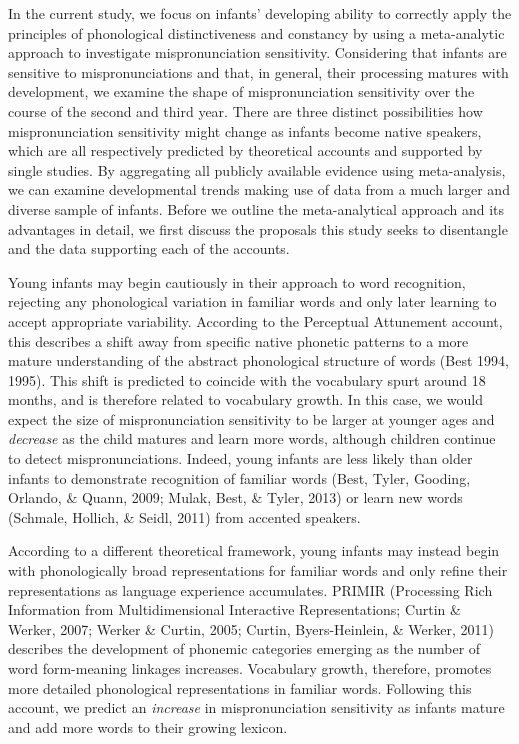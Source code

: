 \documentclass[man]{apa6}
\theoremstyle{definition}
\theoremstyle{definition}
\theoremstyle{definition}
\theoremstyle{remark}
\begin{document}
In the current study, we focus on infants' developing ability to
correctly apply the principles of phonological distinctiveness and
constancy by using a meta-analytic approach to investigate
mispronunciation sensitivity. Considering that infants are sensitive to
mispronunciations and that, in general, their processing matures with
development, we examine the shape of mispronunciation sensitivity over
the course of the second and third year. There are three distinct
possibilities how mispronunciation sensitivity might change as infants
become native speakers, which are all respectively predicted by
theoretical accounts and supported by single studies. By aggregating all
publicly available evidence using meta-analysis, we can examine
developmental trends making use of data from a much larger and diverse
sample of infants. Before we outline the meta-analytical approach and
its advantages in detail, we first discuss the proposals this study
seeks to disentangle and the data supporting each of the accounts.

Young infants may begin cautiously in their approach to word
recognition, rejecting any phonological variation in familiar words and
only later learning to accept appropriate variability. According to the
Perceptual Attunement account, this describes a shift away from specific
native phonetic patterns to a more mature understanding of the abstract
phonological structure of words (Best 1994, 1995). This shift is
predicted to coincide with the vocabulary spurt around 18 months, and is
therefore related to vocabulary growth. In this case, we would expect
the size of mispronunciation sensitivity to be larger at younger ages
and \emph{decrease} as the child matures and learn more words, although
children continue to detect mispronunciations. Indeed, young infants are
less likely than older infants to demonstrate recognition of familiar
words (Best, Tyler, Gooding, Orlando, \& Quann, 2009; Mulak, Best, \&
Tyler, 2013) or learn new words (Schmale, Hollich, \& Seidl, 2011) from
accented speakers.

According to a different theoretical framework, young infants may
instead begin with phonologically broad representations for familiar
words and only refine their representations as language experience
accumulates. PRIMIR (Processing Rich Information from Multidimensional
Interactive Representations; Curtin \& Werker, 2007; Werker \& Curtin,
2005; Curtin, Byers-Heinlein, \& Werker, 2011) describes the development
of phonemic categories emerging as the number of word form-meaning
linkages increases. Vocabulary growth, therefore, promotes more detailed
phonological representations in familiar words. Following this account,
we predict an \emph{increase} in mispronunciation sensitivity as infants
mature and add more words to their growing lexicon.
\end{document}
